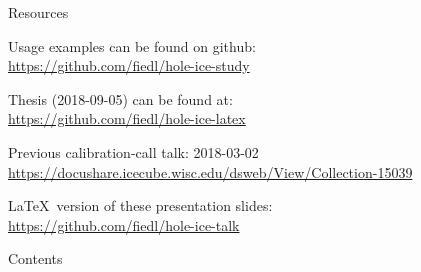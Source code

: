 \begin{frame}{Resources}
  \begin{center}
    Usage examples can be found on github: \\ \vspace{0.2cm}
    \url{https://github.com/fiedl/hole-ice-study}

    \vspace{1cm}

    Thesis (2018-09-05) can be found at: \\ \vspace{0.2cm}
    \url{https://github.com/fiedl/hole-ice-latex}

    \vspace{1cm}

    Previous calibration-call talk: 2018-03-02 \\ \vspace{0.2cm}
    \url{https://docushare.icecube.wisc.edu/dsweb/View/Collection-15039}

    \vspace{1cm}

    \LaTeX\ version of these presentation slides: \\ \vspace{0.2cm}
    \url{https://github.com/fiedl/hole-ice-talk}
  \end{center}
\end{frame}

\begin{frame}{Contents}

  \tableofcontents[subsectionstyle=show]


\end{frame}
